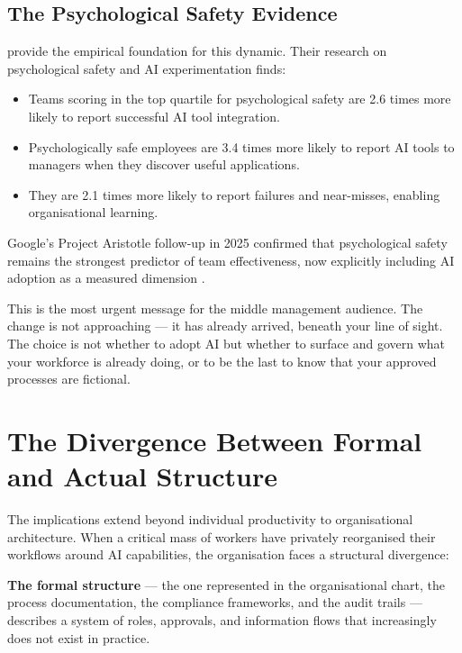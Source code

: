 \subsection{The Psychological Safety Evidence}

\textcite{EdmondsonLei2025} provide the empirical foundation for this dynamic. Their research on psychological safety and AI experimentation finds:

\begin{itemize}
  \item Teams scoring in the top quartile for psychological safety are 2.6 times more likely to report successful AI tool integration.
  \item Psychologically safe employees are 3.4 times more likely to report AI tools to managers when they discover useful applications.
  \item They are 2.1 times more likely to report failures and near-misses, enabling organisational learning.
\end{itemize}

Google's Project Aristotle follow-up in 2025 confirmed that psychological safety remains the strongest predictor of team effectiveness, now explicitly including AI adoption as a measured dimension \parencite{GoogleAristotle2025}.

\begin{cautionbox}[title={The Urgency for Middle Managers}]
This is the most urgent message for the middle management audience. The change is not approaching --- it has already arrived, beneath your line of sight. The choice is not whether to adopt AI but whether to surface and govern what your workforce is already doing, or to be the last to know that your approved processes are fictional.
\end{cautionbox}

\section{The Divergence Between Formal and Actual Structure}

The implications extend beyond individual productivity to organisational architecture. When a critical mass of workers have privately reorganised their workflows around AI capabilities, the organisation faces a structural divergence:

\textbf{The formal structure} --- the one represented in the organisational chart, the process documentation, the compliance frameworks, and the audit trails --- describes a system of roles, approvals, and information flows that increasingly does not exist in practice.

